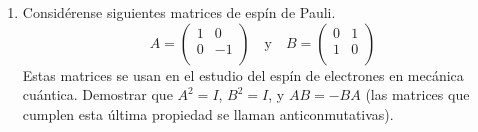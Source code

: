 \documentclass[a4paper]{article}
\begin{document}
\begin{enumerate}[leftmargin=*]
\item Considérense siguientes matrices de espín de Pauli. 
\[
A=\left(
\begin{array}{rr}
 1 &  0 \\
 0 & -1 \\
\end{array}
\right)
\quad \textrm{y} \quad
B=\left(
\begin{array}{rr}
 0 & 1 \\
 1 & 0 \\
\end{array}
\right)
\]
Estas matrices se usan en el estudio del espín de electrones en mecánica cuántica. Demostrar que $A^2=I$, $B^2=I$, y $AB=-BA$ (las matrices que cumplen esta última propiedad se llaman anticonmutativas). 

\end{enumerate}
\end{document}
